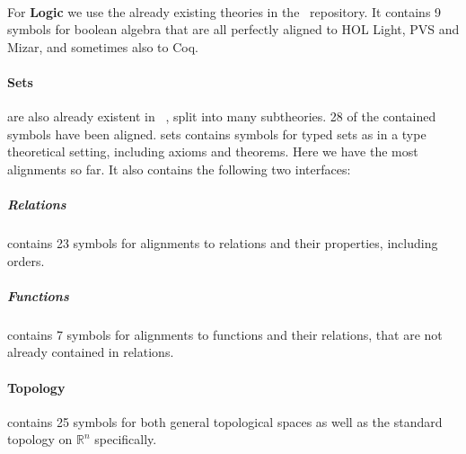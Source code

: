   \paragraph{} For \textbf{Logic} we use the already existing theories in the~\cite{mitm:foundation:on} repository. It contains 9 symbols for boolean algebra that are all perfectly aligned to HOL Light, PVS and Mizar, and sometimes also to Coq.
  \paragraph{Sets} are also already existent in ~\cite{mitm:smglom:on}, split into many subtheories. 28 of the contained symbols have been aligned. sets contains symbols for typed sets as in a type theoretical setting, including axioms and theorems. Here we have the most alignments so far. It also contains the following two interfaces:
  	\subparagraph{Relations} contains 23 symbols for alignments to relations and their properties, including orders. 
  	\subparagraph{Functions} contains 7 symbols for alignments to functions and their relations, that are not already contained in relations. 
  \paragraph{Topology} contains 25 symbols for both general topological spaces as well as the standard topology on $\mathbb R^n$ specifically. %
 

